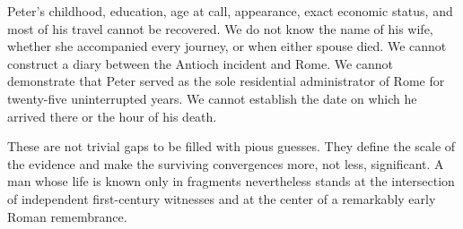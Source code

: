 Peter's childhood, education, age at call, appearance, exact economic status,
and most of his travel cannot be recovered. We do not know the name of his
wife, whether she accompanied every journey, or when either spouse died. We
cannot construct a diary between the Antioch incident and Rome. We cannot
demonstrate that Peter served as the sole residential administrator of Rome
for twenty-five uninterrupted years. We cannot establish the date on which he
arrived there or the hour of his death.

These are not trivial gaps to be filled with pious guesses. They define the
scale of the evidence and make the surviving convergences more, not less,
significant. A man whose life is known only in fragments nevertheless stands
at the intersection of independent first-century witnesses and at the center
of a remarkably early Roman remembrance.
